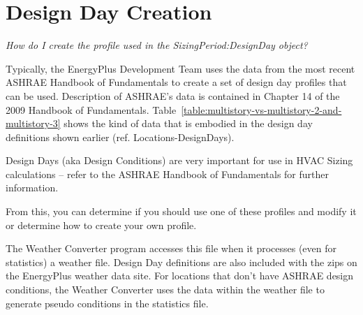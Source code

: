 \section{Design Day Creation}\label{design-day-creation}

\emph{How do I create the profile used in the SizingPeriod:DesignDay object?}

Typically, the EnergyPlus Development Team uses the data from the most recent ASHRAE Handbook of Fundamentals to create a set of design day profiles that can be used. Description of ASHRAE's data is contained in Chapter 14 of the 2009 Handbook of Fundamentals. Table~\ref{table:multistory-vs-multistory-2-and-multistory-3} shows the kind of data that is embodied in the design day definitions shown earlier (ref. Locations-DesignDays).

Design Days (aka Design Conditions) are very important for use in HVAC Sizing calculations -- refer to the ASHRAE Handbook of Fundamentals for further information.

From this, you can determine if you should use one of these profiles and modify it or determine how to create your own profile.

The Weather Converter program accesses this file when it processes (even for statistics) a weather file. Design Day definitions are also included with the zips on the EnergyPlus weather data site. For locations that don't have ASHRAE design conditions, the Weather Converter uses the data within the weather file to generate pseudo conditions in the statistics file.
